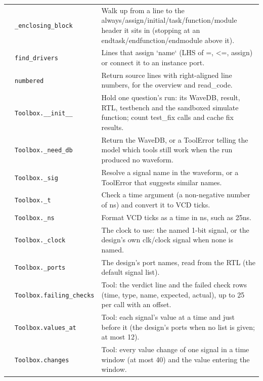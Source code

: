 \begin{longtable}{@{}p{2.8cm}>{\raggedright\arraybackslash}p{4.6cm}p{7.9cm}@{}}
{\small } & \texttt{\small \_\allowbreak{}enclosing\_\allowbreak{}block} & Walk up from a line to the always/assign/initial/task/function/module header it sits in (stopping at an endtask/endfunction/endmodule above it). \\
{\small } & \texttt{\small find\_\allowbreak{}drivers} & Lines that assign `name` (LHS of =, \textless{}=, assign) or connect it to an instance port. \\
{\small } & \texttt{\small numbered} & Return source lines with right-aligned line numbers, for the overview and read\_code. \\
{\small } & \texttt{\small Toolbox.\allowbreak \_\allowbreak{}\_\allowbreak{}init\_\allowbreak{}\_\allowbreak{}} & Hold one question's run: its WaveDB, result, RTL, testbench and the sandboxed simulate function; count test\_fix calls and cache fix results. \\
{\small } & \texttt{\small Toolbox.\allowbreak \_\allowbreak{}need\_\allowbreak{}db} & Return the WaveDB, or a ToolError telling the model which tools still work when the run produced no waveform. \\
{\small } & \texttt{\small Toolbox.\allowbreak \_\allowbreak{}sig} & Resolve a signal name in the waveform, or a ToolError that suggests similar names. \\
{\small } & \texttt{\small Toolbox.\allowbreak \_\allowbreak{}t} & Check a time argument (a non-negative number of ns) and convert it to VCD ticks. \\
{\small } & \texttt{\small Toolbox.\allowbreak \_\allowbreak{}ns} & Format VCD ticks as a time in ns, such as 25ns. \\
{\small } & \texttt{\small Toolbox.\allowbreak \_\allowbreak{}clock} & The clock to use: the named 1-bit signal, or the design's own clk/clock signal when none is named. \\
{\small } & \texttt{\small Toolbox.\allowbreak \_\allowbreak{}ports} & The design's port names, read from the RTL (the default signal list). \\
{\small } & \texttt{\small Toolbox.\allowbreak failing\_\allowbreak{}checks} & Tool: the verdict line and the failed check rows (time, type, name, expected, actual), up to 25 per call with an offset. \\
{\small } & \texttt{\small Toolbox.\allowbreak values\_\allowbreak{}at} & Tool: each signal's value at a time and just before it (the design's ports when no list is given; at most 12). \\
{\small } & \texttt{\small Toolbox.\allowbreak changes} & Tool: every value change of one signal in a time window (at most 40) and the value entering the window. \\

\end{longtable}
